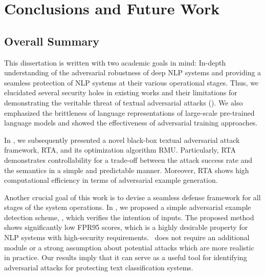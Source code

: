 \chapter{Conclusions and Future Work} %
\label{ch:conclusion} 

\section{Overall Summary}
\label{sec:overall_summary}

This dissertation is written with two academic goals in mind: \Ni In-depth understanding of the adversarial robustness of deep NLP systems and \Nii providing a seamless protection of NLP systems at their various operational stages. Thus, we elucidated several security holes in existing works and their limitations for demonstrating the veritable threat of textual adversarial attacks (\cf {}). We also emphasized the brittleness of language representations of large-scale pre-trained language models and showed the effectiveness of adversarial training approaches. 

In , we subsequently presented a novel black-box textual adversarial attack framework, RTA, and its optimization algorithm RMU. Particularly, RTA demonstrates controllability for a trade-off between the attack success rate and the semantics in a simple and predictable manner. Moreover, RTA shows high computational efficiency in terms of adversarial example generation. 

Another crucial goal of this work is to devise a seamless defense framework for all stages of the system operations. In , we proposed a simple adversarial example detection scheme, \gradmask, which verifies the intention of inputs. The proposed method shows significantly low FPR95 scores, which is a highly desirable property for NLP systems with high-security requirements. \gradmask\ does not require an additional module or a strong assumption about potential attacks which are more realistic in practice. Our results imply that it can serve as a useful tool for identifying adversarial attacks for protecting text classification systems.


